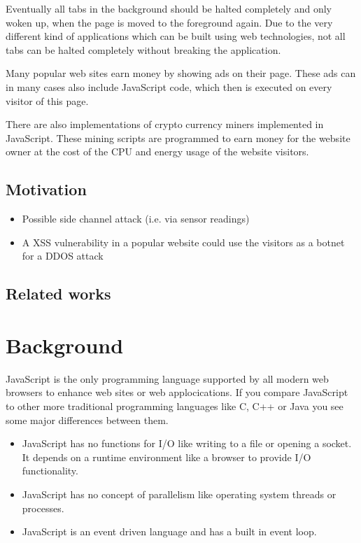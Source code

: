 \documentclass[article,type=bsc,colorback,accentcolor=tud9c]{tudthesis}
\begin{document}
  Eventually all tabs in the background should be halted completely and only woken up, when the page is moved to the foreground again. Due to the very different kind of applications which can be built using web technologies, not all tabs can be halted completely without breaking the application.

  Many popular web sites earn money by showing ads on their page. These ads can in many cases also include JavaScript code, which then is executed on every visitor of this page.

  There are also implementations of crypto currency miners implemented in JavaScript. These mining scripts are programmed to earn money for the website owner at the cost of the CPU and energy usage of the website visitors.
  
  \subsection{Motivation}

  \begin{itemize}
  \item Possible side channel attack (i.e. via sensor readings)
  \item A XSS vulnerability in a popular website could use the visitors as a botnet for a DDOS attack
  \end{itemize}

  \subsection{Related works}
  
  

  
  \newpage
  \section{Background}

  JavaScript is the only programming language supported by all modern web browsers to enhance web sites or web applocications. If you compare JavaScript to other more traditional programming languages like C, C++ or Java you see some major differences between them.

  \begin{itemize}
  \item JavaScript has no functions for I/O like writing to a file or opening a socket. It depends on a runtime environment like a browser to provide I/O functionality.
  \item JavaScript has no concept of parallelism like operating system threads or processes.
  \item JavaScript is an event driven language and has a built in event loop.
  \end{itemize}
\end{document}
